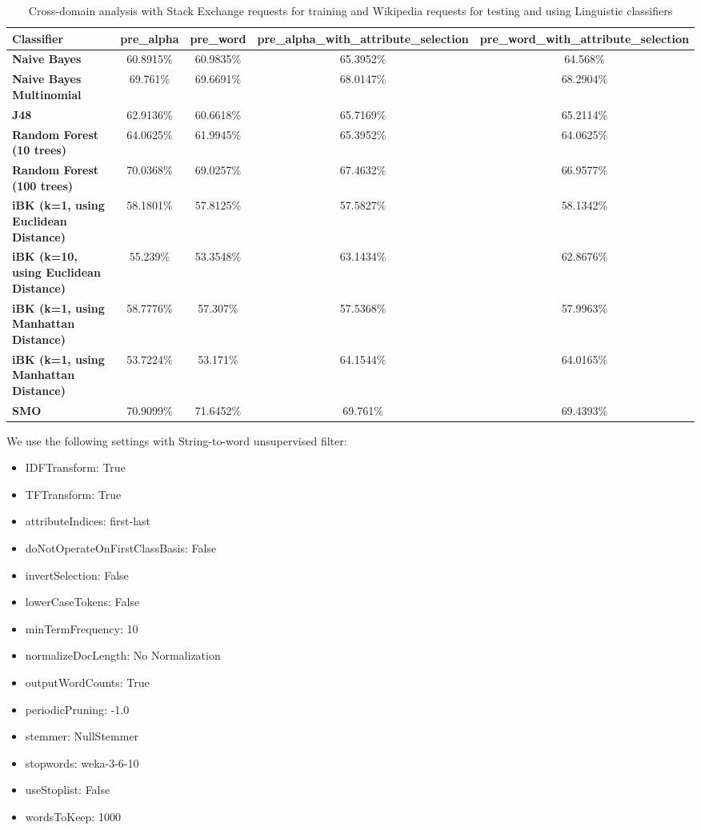 \documentclass[conference]{IEEEtran}
\begin{document}
\begin{table*}[htbp]
\caption{Cross-domain analysis with Stack Exchange requests for training and Wikipedia requests for testing and using Linguistic classifiers }
\centering
\vspace{5pt}
\begin{tabular}{|l|c|c|c|c|}
\hline
\textbf{Classifier} & \textbf{pre\_alpha} & \textbf{pre\_word} & \textbf{pre\_alpha\_with\_attribute\_selection} & \textbf{pre\_word\_with\_attribute\_selection} \\
\hline\hline
\textbf{Naive Bayes} & 60.8915\% & 60.9835\% & 65.3952\% & 64.568\% \\ 
\hline
\textbf{Naive Bayes Multinomial} & 69.761\% & 69.6691\% & 68.0147\% & 68.2904\% \\ 
\hline
\textbf{J48} & 62.9136\% & 60.6618\% & 65.7169\% & 65.2114\% \\ 
\hline
\textbf{Random Forest (10 trees)} & 64.0625\% & 61.9945\% & 65.3952\% & 64.0625\% \\ 
\hline
\textbf{Random Forest (100 trees)} & 70.0368\% & 69.0257\% & 67.4632\% & 66.9577\% \\ 
\hline
\textbf{iBK (k=1, using Euclidean Distance)} & 58.1801\% & 57.8125\% & 57.5827\% & 58.1342\% \\ 
\hline
\textbf{iBK (k=10, using Euclidean Distance)} & 55.239\% & 53.3548\% & 63.1434\% & 62.8676\% \\ 
\hline
\textbf{iBK (k=1, using Manhattan Distance)} & 58.7776\% & 57.307\% & 57.5368\% & 57.9963\% \\ 
\hline
\textbf{iBK (k=1, using Manhattan Distance)} & 53.7224\% & 53.171\% & 64.1544\% & 64.0165\% \\ 
\hline
\textbf{SMO} & 70.9099\% & 71.6452\% & 69.761\% & 69.4393\% \\ 
\hline
\hline
\end{tabular}
\label{table:cross-domain-stack-Ling}
\end{table*}

We use the following settings with String-to-word unsupervised filter:
\begin{itemize}
\item IDFTransform: True
\item TFTransform: True
\item attributeIndices: first-last
\item doNotOperateOnFirstClassBasis: False
\item invertSelection: False
\item lowerCaseTokens: False
\item minTermFrequency: 10
\item normalizeDocLength: No Normalization
\item outputWordCounts: True
\item periodicPruning: -1.0
\item stemmer: NullStemmer
\item stopwords: weka-3-6-10
\item useStoplist: False
\item wordsToKeep: 1000
\end{itemize}
\end{document}
